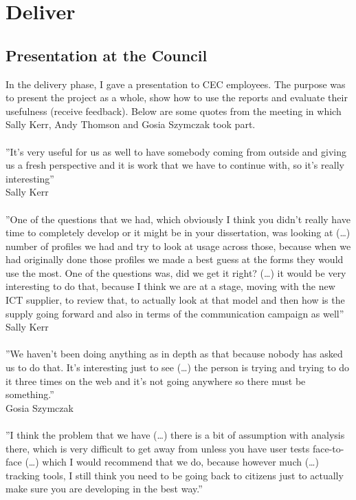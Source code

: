 	\section{Deliver}
	
		\subsection{Presentation at the Council}
		
In the delivery phase, I gave a presentation to CEC employees. The purpose was to present the project as a whole, show how to use the reports and evaluate their usefulness (receive feedback). Below are some quotes from the meeting in which Sally Kerr, Andy Thomson and Gosia Szymczak took part.\\\\
''It's very useful for us as well to have somebody coming from outside and giving us a fresh perspective and it is work that we have to continue with, so it's really interesting''\\
Sally Kerr\\\\
''One of the questions that we had, which obviously I think you didn't really have time to completely develop or it might be in your dissertation, was looking at (…) number of profiles we had and try to look at usage across those, because when we had originally done those profiles we made a best guess at the forms they would use the most. One of the questions was, did we get it right? (…) it would be very interesting to do that, because I think we are at a stage, moving with the new ICT supplier, to review that, to actually look at that model and then how is the supply going forward and also in terms of the communication campaign as well''\\
Sally Kerr\\\\
''We haven't been doing anything as in depth as that because nobody has asked us to do that. It's interesting just to see (…) the person is trying and trying to do it three times on the web and it's not going anywhere so there must be something.''\\
Gosia Szymczak\\\\
''I think the problem that we have (…) there is a bit of assumption with analysis there, which is very difficult to get away from unless you have user tests face-to-face (…) which I would recommend that we do, because however much (…) tracking tools, I still think you need to be going back to citizens just to actually make sure you are developing in the best way.''\\
